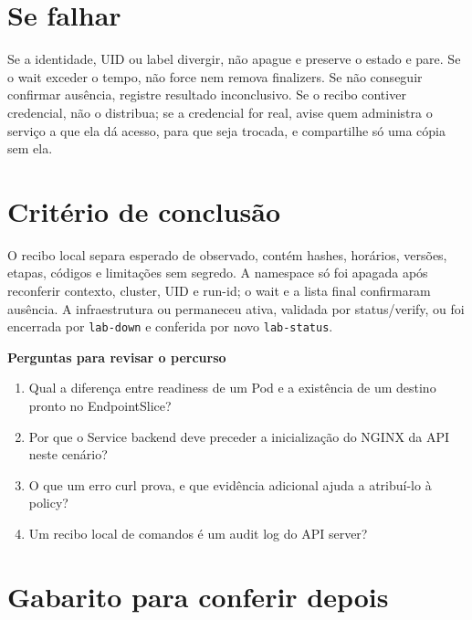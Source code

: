 \documentclass[12pt,openany,oneside,a4paper,chapter=TITLE,english,brazil]{abntex2}
\providecommand{\tightlist}{\setlength{\itemsep}{0pt}\setlength{\parskip}{0pt}}
\begin{document}
\section*{Se falhar}\label{se-falhar-5}

Se a identidade, UID ou label divergir, não apague e preserve o estado e pare. Se o wait exceder o tempo, não force nem remova finalizers. Se não conseguir confirmar ausência, registre resultado inconclusivo. Se o recibo contiver credencial, não o distribua; se a credencial for real, avise quem administra o serviço a que ela dá acesso, para que seja trocada, e compartilhe só uma cópia sem ela.

\section*{Critério de conclusão}\label{crituxe9rio-de-conclusuxe3o}

O recibo local separa esperado de observado, contém hashes, horários, versões, etapas, códigos e limitações sem segredo. A namespace só foi apagada após reconferir contexto, cluster, UID e run-id; o wait e a lista final confirmaram ausência. A infraestrutura ou permaneceu ativa, validada por status/verify, ou foi encerrada por \texttt{lab-{}\allowbreak{}down} e conferida por novo \texttt{lab-{}\allowbreak{}status}.

\textbf{Perguntas para revisar o percurso}

\begin{enumerate}
\def\labelenumi{\arabic{enumi}.}
\tightlist
\item
  Qual a diferença entre readiness de um Pod e a existência de um destino pronto no EndpointSlice?
\item
  Por que o Service backend deve preceder a inicialização do NGINX da API neste cenário?
\item
  O que um erro curl prova, e que evidência adicional ajuda a atribuí-lo à policy?
\item
  Um recibo local de comandos é um audit log do API server?
\end{enumerate}

\section*{Gabarito para conferir depois}\label{gabarito-para-conferir-depois-5}
\end{document}
